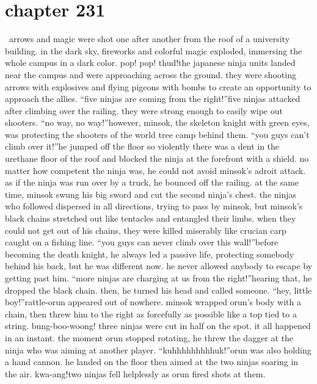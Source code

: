 \section{chapter 231}






 arrows and magic were shot one after another from the roof of a university building.
 in the dark sky, fireworks and colorful magic exploded, immersing the whole campus in a dark color.
pop! pop! thud!the japanese ninja units landed near the campus and were approaching across the ground.
 they were shooting arrows with explosives and flying pigeons with bombs to create an opportunity to approach the allies.
“five ninjas are coming from the right!”five ninjas attacked after climbing over the railing.
 they were strong enough to easily wipe out shooters.
“no way, no way!”however, minsok, the skeleton knight with green eyes, was protecting the shooters of the world tree camp behind them.
“you guys can’t climb over it!”he jumped off the floor so violently there was a dent in the urethane floor of the roof and blocked the ninja at the forefront with a shield.
no matter how competent the ninja was, he could not avoid minsok’s adroit attack.
 as if the ninja was run over by a truck, he bounced off the railing.
at the same time, minsok swung his big sword and cut the second ninja’s chest.
the ninjas who followed dispersed in all directions, trying to pass by minsok, but minsok’s black chains stretched out like tentacles and entangled their limbs.
 when they could not get out of his chains, they were killed miserably like crucian carp caught on a fishing line.
“you guys can never climb over this wall!”before becoming the death knight, he always led a passive life, protecting somebody behind his back, but he was different now.
 he never allowed anybody to escape by getting past him.
“more ninjas are charging at us from the right!”hearing that, he dropped the black chain.
 then, he turned his head and called someone.
“hey, little boy!”rattle-orun appeared out of nowhere.
 minsok wrapped orun’s body with a chain, then threw him to the right as forcefully as possible like a top tied to a string.
bung-boo-woong!
three ninjas were cut in half on the spot.
 it all happened in an instant.
 the moment orun stopped rotating, he threw the dagger at the ninja who was aiming at another player.
“kuhhhhhhhhhuk!”orun was also holding a hand cannon.
 he landed on the floor then aimed at the two ninjas soaring in the air.
kwa-ang!two ninjas fell helplessly as orun fired shots at them.
